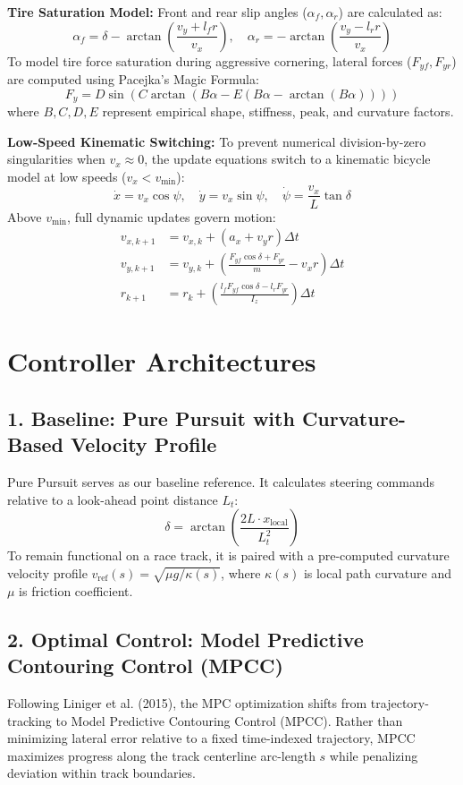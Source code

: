 \documentclass[12pt]{article}
\begin{document}
\textbf{Tire Saturation Model:} Front and rear slip angles ($\alpha_f, \alpha_r$) are calculated as:
\[ \alpha_f = \delta - \arctan\left(\frac{v_y + l_f r}{v_x}\right), \quad \alpha_r = -\arctan\left(\frac{v_y - l_r r}{v_x}\right) \]
To model tire force saturation during aggressive cornering, lateral forces ($F_{yf}, F_{yr}$) are computed using Pacejka's Magic Formula:
\[ F_{y} = D \sin\left(C \arctan\left(B \alpha - E (B \alpha - \arctan(B \alpha))\right)\right) \]
where $B, C, D, E$ represent empirical shape, stiffness, peak, and curvature factors.

\textbf{Low-Speed Kinematic Switching:} To prevent numerical division-by-zero singularities when $v_x \approx 0$, the update equations switch to a kinematic bicycle model at low speeds ($v_x < v_{\text{min}}$):
\[ \dot{x} = v_x \cos\psi, \quad \dot{y} = v_x \sin\psi, \quad \dot{\psi} = \frac{v_x}{L} \tan\delta \]
Above $v_{\text{min}}$, full dynamic updates govern motion:
\begin{align*}
v_{x, k+1} &= v_{x, k} + (a_x + v_y r) \Delta t \\
v_{y, k+1} &= v_{y, k} + \left( \frac{F_{yf}\cos\delta + F_{yr}}{m} - v_x r \right) \Delta t \\
r_{k+1} &= r_k + \left( \frac{l_f F_{yf}\cos\delta - l_r F_{yr}}{I_z} \right) \Delta t
\end{align*}

\section{Controller Architectures}

\subsection*{1. Baseline: Pure Pursuit with Curvature-Based Velocity Profile}
Pure Pursuit serves as our baseline reference. It calculates steering commands relative to a look-ahead point distance $L_t$:
\[ \delta = \arctan\left(\frac{2L \cdot x_{\text{local}}}{L_t^2}\right) \]
To remain functional on a race track, it is paired with a pre-computed curvature velocity profile $v_{\text{ref}}(s) = \sqrt{\mu g / \kappa(s)}$, where $\kappa(s)$ is local path curvature and $\mu$ is friction coefficient.

\subsection*{2. Optimal Control: Model Predictive Contouring Control (MPCC)}
Following Liniger et al. (2015), the MPC optimization shifts from trajectory-tracking to Model Predictive Contouring Control (MPCC). Rather than minimizing lateral error relative to a fixed time-indexed trajectory, MPCC maximizes progress along the track centerline arc-length $s$ while penalizing deviation within track boundaries.
\end{document}

